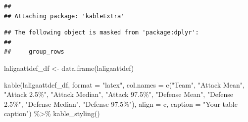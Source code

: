 \documentclass[
]{article}
\newenvironment{Shaded}{\begin{snugshade}}{\end{snugshade}}
\newcommand{\AttributeTok}[1]{\textcolor[rgb]{0.77,0.63,0.00}{#1}}
\newcommand{\FunctionTok}[1]{\textcolor[rgb]{0.00,0.00,0.00}{#1}}
\newcommand{\NormalTok}[1]{#1}
\newcommand{\OtherTok}[1]{\textcolor[rgb]{0.56,0.35,0.01}{#1}}
\newcommand{\SpecialCharTok}[1]{\textcolor[rgb]{0.00,0.00,0.00}{#1}}
\newcommand{\StringTok}[1]{\textcolor[rgb]{0.31,0.60,0.02}{#1}}
\begin{document}
\begin{verbatim}
## 
## Attaching package: 'kableExtra'
\end{verbatim}

\begin{verbatim}
## The following object is masked from 'package:dplyr':
## 
##     group_rows
\end{verbatim}

\begin{Shaded}
\begin{Highlighting}[]
\NormalTok{laligaattdef\_df }\OtherTok{\textless{}{-}} \FunctionTok{data.frame}\NormalTok{(laligaattdef)}

\FunctionTok{kable}\NormalTok{(laligaattdef\_df, }
      \AttributeTok{format =} \StringTok{"latex"}\NormalTok{,}
      \AttributeTok{col.names =} \FunctionTok{c}\NormalTok{(}\StringTok{"Team"}\NormalTok{, }\StringTok{"Attack Mean"}\NormalTok{, }\StringTok{"Attack 2.5\%"}\NormalTok{, }\StringTok{"Attack Median"}\NormalTok{, }\StringTok{"Attack 97.5\%"}\NormalTok{,}
                    \StringTok{"Defense Mean"}\NormalTok{, }\StringTok{"Defense 2.5\%"}\NormalTok{, }\StringTok{"Defense Median"}\NormalTok{, }\StringTok{"Defense 97.5\%"}\NormalTok{),}
      \AttributeTok{align =} \StringTok{\textquotesingle{}c\textquotesingle{}}\NormalTok{, }
      \AttributeTok{caption =} \StringTok{"Your table caption"}\NormalTok{) }\SpecialCharTok{\%\textgreater{}\%}
  \FunctionTok{kable\_styling}\NormalTok{()}
\end{Highlighting}
\end{Shaded}
\end{document}
